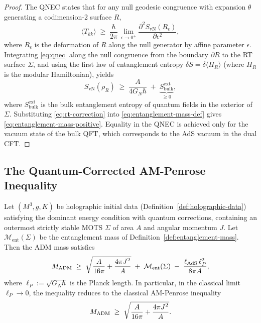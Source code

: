 \begin{proof}
The QNEC \cite{bousso2015, koymangenk2019} states that for any null geodesic congruence with expansion $\theta$ generating a codimension-2 surface $R$,
\begin{equation}\label{eq:qnec}
\langle T_{kk}\rangle \;\geq\; \dfrac{\hbar}{2\pi}\,\lim_{\epsilon\to 0^+} \dfrac{\partial^2 S_{\mathrm{vN}}(R_\epsilon)}{\partial\epsilon^2},
\end{equation}
where $R_\epsilon$ is the deformation of $R$ along the null generator by affine parameter $\epsilon$. Integrating \eqref{eq:qnec} along the null congruence from the boundary $\partial R$ to the RT surface $\Sigma$, and using the first law of entanglement entropy $\delta S = \delta\langle H_R\rangle$ (where $H_R$ is the modular Hamiltonian), yields
\begin{equation}\label{eq:rt-correction}
S_{\mathrm{vN}}(\rho_R) \;\geq\; \dfrac{A}{4G_N\hbar} \;+\; \underbrace{S_{\mathrm{bulk}}^{\mathrm{ext}}}_{\geq 0},
\end{equation}
where $S_{\mathrm{bulk}}^{\mathrm{ext}}$ is the bulk entanglement entropy of quantum fields in the exterior of $\Sigma$. Substituting \eqref{eq:rt-correction} into \eqref{eq:entanglement-mass-def} gives \eqref{eq:entanglement-mass-positive}. Equality in the QNEC is achieved only for the vacuum state of the bulk QFT, which corresponds to the AdS vacuum in the dual CFT.
\end{proof}

\subsection{The Quantum-Corrected AM-Penrose Inequality}

\begin{theorem}\label{thm:quantum-ampi}
Let $(M^3, g, K)$ be holographic initial data (Definition~\ref{def:holographic-data}) satisfying the dominant energy condition with quantum corrections, containing an outermost strictly stable MOTS $\Sigma$ of area $A$ and angular momentum $J$. Let $\mathcal{M}_{\mathrm{ent}}(\Sigma)$ be the entanglement mass of Definition~\ref{def:entanglement-mass}. Then the ADM mass satisfies
\begin{equation}\label{eq:quantum-ampi}
M_{\mathrm{ADM}} \;\geq\; \sqrt{\dfrac{A}{16\pi} + \dfrac{4\pi J^2}{A}} \;+\; \mathcal{M}_{\mathrm{ent}}(\Sigma) \;-\; \dfrac{\ell_{\mathrm{AdS}}\,\ell_P^2}{8\pi A},
\end{equation}
where $\ell_P := \sqrt{G_N\hbar}$ is the Planck length. In particular, in the classical limit $\ell_P \to 0$, the inequality reduces to the classical AM-Penrose inequality
\begin{equation}\label{eq:classical-limit}
M_{\mathrm{ADM}} \;\geq\; \sqrt{\dfrac{A}{16\pi} + \dfrac{4\pi J^2}{A}}.
\end{equation}
\end{theorem}

